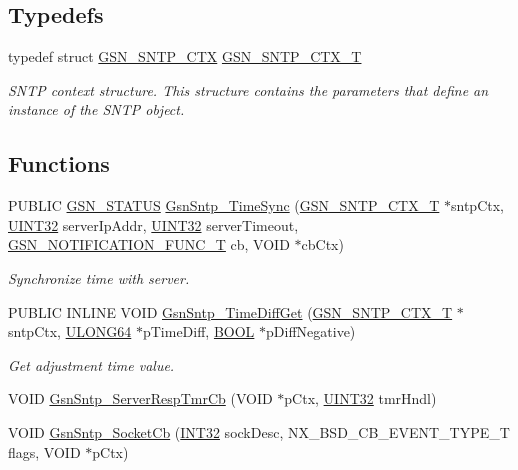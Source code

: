 \subsection*{Typedefs}
\begin{DoxyCompactItemize}
\item 
typedef struct \hyperlink{a00227}{GSN\_\-SNTP\_\-CTX} \hyperlink{a00672_gae0179c63a9e6988c361e8d0deb285a24}{GSN\_\-SNTP\_\-CTX\_\-T}
\begin{DoxyCompactList}\small\item\em SNTP context structure. This structure contains the parameters that define an instance of the SNTP object. \end{DoxyCompactList}\end{DoxyCompactItemize}
\subsection*{Functions}
\begin{DoxyCompactItemize}
\item 
PUBLIC \hyperlink{a00660_gada5951904ac6110b1fa95e51a9ddc217}{GSN\_\-STATUS} \hyperlink{a00672_ga71cfb857bfbf8d5de080ef4f5807b0d0}{GsnSntp\_\-TimeSync} (\hyperlink{a00227}{GSN\_\-SNTP\_\-CTX\_\-T} $\ast$sntpCtx, \hyperlink{a00660_gae1e6edbbc26d6fbc71a90190d0266018}{UINT32} serverIpAddr, \hyperlink{a00660_gae1e6edbbc26d6fbc71a90190d0266018}{UINT32} serverTimeout, \hyperlink{a00481_aac7371fae4e423f90332caf551b62cf1}{GSN\_\-NOTIFICATION\_\-FUNC\_\-T} cb, VOID $\ast$cbCtx)
\begin{DoxyCompactList}\small\item\em Synchronize time with server. \end{DoxyCompactList}\item 
PUBLIC INLINE VOID \hyperlink{a00672_ga0e7313023463ed1799f84c4b49ad4f91}{GsnSntp\_\-TimeDiffGet} (\hyperlink{a00227}{GSN\_\-SNTP\_\-CTX\_\-T} $\ast$sntpCtx, \hyperlink{a00660_ga28961430434ccabca6862ea93fe9a15b}{ULONG64} $\ast$pTimeDiff, \hyperlink{a00660_ga1f04022c0a182c51c059438790ea138c}{BOOL} $\ast$pDiffNegative)
\begin{DoxyCompactList}\small\item\em Get adjustment time value. \end{DoxyCompactList}\item 
VOID \hyperlink{a00585_a6d8c8f72f24aa1b51d1efaafd25feb19}{GsnSntp\_\-ServerRespTmrCb} (VOID $\ast$pCtx, \hyperlink{a00660_gae1e6edbbc26d6fbc71a90190d0266018}{UINT32} tmrHndl)
\item 
VOID \hyperlink{a00585_a899703a2f77e7e303de46351018c09e8}{GsnSntp\_\-SocketCb} (\hyperlink{a00660_ga63021d67d54286c2163bcdb43a6f2569}{INT32} sockDesc, NX\_\-BSD\_\-CB\_\-EVENT\_\-TYPE\_\-T flags, VOID $\ast$pCtx)
\end{DoxyCompactItemize}



